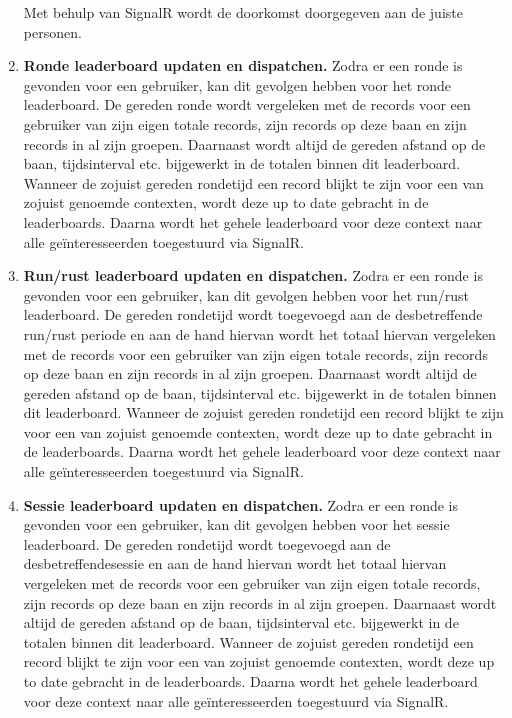 \begin{enumerate}
Met behulp van SignalR wordt de doorkomst doorgegeven aan de juiste personen.

\item \textbf{Ronde leaderboard updaten en dispatchen.}
Zodra er een ronde is gevonden voor een gebruiker, kan dit gevolgen hebben voor het ronde leaderboard. De gereden ronde wordt vergeleken met de records voor een gebruiker van zijn eigen totale records, zijn records op deze baan en zijn records in al zijn groepen. Daarnaast wordt altijd de gereden afstand op de baan, tijdsinterval etc. bijgewerkt in de totalen binnen dit leaderboard. Wanneer de zojuist gereden rondetijd een record blijkt te zijn voor een van zojuist genoemde contexten, wordt deze up to date gebracht in de leaderboards. Daarna wordt het gehele leaderboard voor deze context naar alle geïnteresseerden toegestuurd via SignalR.

\item \textbf{Run/rust leaderboard updaten en dispatchen.}
Zodra er een ronde is gevonden voor een gebruiker, kan dit gevolgen hebben voor het run/rust leaderboard. De gereden rondetijd wordt toegevoegd aan de desbetreffende run/rust periode en aan de hand hiervan wordt het totaal hiervan vergeleken met de records voor een gebruiker van zijn eigen totale records, zijn records op deze baan en zijn records in al zijn groepen. Daarnaast wordt altijd de gereden afstand op de baan, tijdsinterval etc. bijgewerkt in de totalen binnen dit leaderboard. Wanneer de zojuist gereden rondetijd een record blijkt te zijn voor een van zojuist genoemde contexten, wordt deze up to date gebracht in de leaderboards. Daarna wordt het gehele leaderboard voor deze context naar alle geïnteresseerden toegestuurd via SignalR.

\item \textbf{Sessie leaderboard updaten en dispatchen.}
Zodra er een ronde is gevonden voor een gebruiker, kan dit gevolgen hebben voor het sessie leaderboard. De gereden rondetijd wordt toegevoegd aan de desbetreffendesessie en aan de hand hiervan wordt het totaal hiervan vergeleken met de records voor een gebruiker van zijn eigen totale records, zijn records op deze baan en zijn records in al zijn groepen. Daarnaast wordt altijd de gereden afstand op de baan, tijdsinterval etc. bijgewerkt in de totalen binnen dit leaderboard. Wanneer de zojuist gereden rondetijd een record blijkt te zijn voor een van zojuist genoemde contexten, wordt deze up to date gebracht in de leaderboards. Daarna wordt het gehele leaderboard voor deze context naar alle geïnteresseerden toegestuurd via SignalR.

\end{enumerate}

